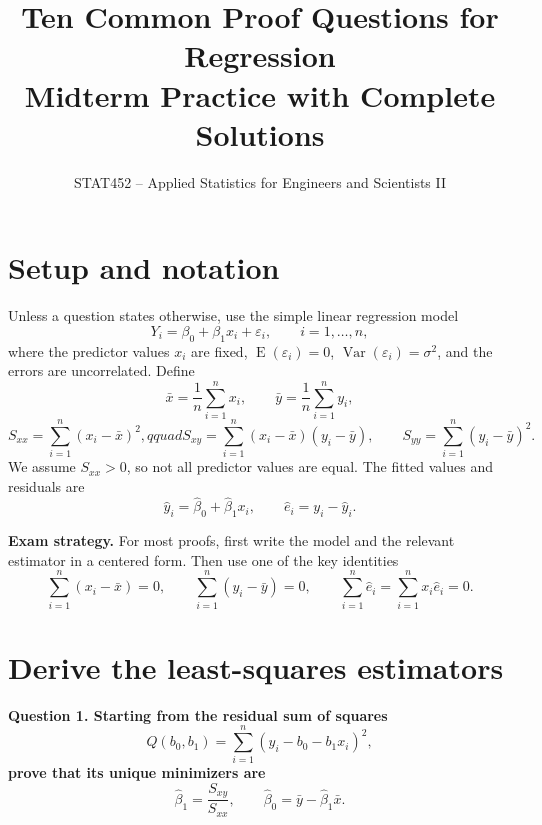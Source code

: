 \documentclass[11pt]{article}
\title{Ten Common Proof Questions for Regression\\
       \large Midterm Practice with Complete Solutions}
\author{STAT452 -- Applied Statistics for Engineers and Scientists II}
\date{}
\newcommand{\Sxx}{S_{xx}}
\newcommand{\Sxy}{S_{xy}}
\newcommand{\Syy}{S_{yy}}
\newcommand{\bzero}{\widehat{\beta}_0}
\newcommand{\bone}{\widehat{\beta}_1}
\newcommand{\yhat}{\widehat{y}}
\newcommand{\e}{\widehat{e}}
\newcommand{\Var}{\operatorname{Var}}
\newcommand{\E}{\operatorname{E}}
\newenvironment{question}
  {\par\medskip\noindent\color{navy}\bfseries}
  {\par\medskip\color{black}}
\begin{document}
\maketitle
\tableofcontents
\bigskip

\section*{Setup and notation}

Unless a question states otherwise, use the simple linear regression model
\[
  Y_i=\beta_0+\beta_1x_i+\varepsilon_i,\qquad i=1,\ldots,n,
\]
where the predictor values $x_i$ are fixed, $\E(\varepsilon_i)=0$,
$\Var(\varepsilon_i)=\sigma^2$, and the errors are uncorrelated. Define
\[
\bar x=\frac1n\sum_{i=1}^n x_i,\qquad
\bar y=\frac1n\sum_{i=1}^n y_i,
\]
\[
\Sxx=\sum_{i=1}^n(x_i-\bar x)^2,qquad
\Sxy=\sum_{i=1}^n(x_i-\bar x)(y_i-\bar y),
\qquad
\Syy=\sum_{i=1}^n(y_i-\bar y)^2.
\]
We assume $\Sxx>0$, so not all predictor values are equal. The fitted values
and residuals are
\[
  \yhat_i=\bzero+\bone x_i,
  \qquad
  \e_i=y_i-\yhat_i.
\]

\noindent\textbf{Exam strategy.} For most proofs, first write the model and
the relevant estimator in a centered form. Then use one of the key identities
\[
\sum_{i=1}^n(x_i-\bar x)=0,
\qquad
\sum_{i=1}^n(y_i-\bar y)=0,
\qquad
\sum_{i=1}^n \e_i=\sum_{i=1}^n x_i\e_i=0.
\]

\newpage

\section{Derive the least-squares estimators}

\begin{question}
Question 1. Starting from the residual sum of squares
\[
  Q(b_0,b_1)=\sum_{i=1}^n(y_i-b_0-b_1x_i)^2,
\]
prove that its unique minimizers are
\[
  \boxed{\bone=\frac{\Sxy}{\Sxx}},
  \qquad
  \boxed{\bzero=\bar y-\bone\bar x}.
\]
\end{question}
\end{document}
